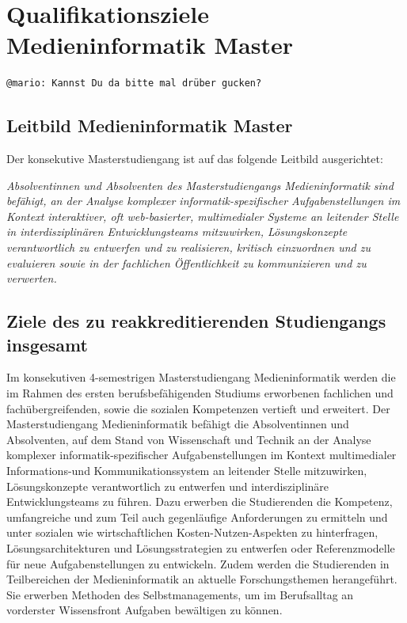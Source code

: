 \chapter{Qualifikationsziele Medieninformatik
Master}\label{qualifikationsziele-medieninformatik-master}

\begin{verbatim}
@mario: Kannst Du da bitte mal drüber gucken?
\end{verbatim}

\section{Leitbild Medieninformatik
Master}\label{leitbild-medieninformatik-master}

Der konsekutive Masterstudiengang ist auf das folgende Leitbild
ausgerichtet:

\emph{Absolventinnen und Absolventen des Masterstudiengangs
Medieninformatik sind befähigt, an der Analyse komplexer
informatik-spezifischer Aufgabenstellungen im Kontext interaktiver, oft
web-basierter, multimedialer Systeme an leitender Stelle in
interdisziplinären Entwicklungsteams mitzuwirken, Lösungskonzepte
verantwortlich zu entwerfen und zu realisieren, kritisch einzuordnen und
zu evaluieren sowie in der fachlichen Öffentlichkeit zu kommunizieren
und zu verwerten.}

\section{Ziele des zu reakkreditierenden Studiengangs
insgesamt}\label{ziele-des-zu-reakkreditierenden-studiengangs-insgesamt}

Im konsekutiven 4-semestrigen Masterstudiengang Medieninformatik werden
die im Rahmen des ersten berufsbefähigenden Studiums erworbenen
fachlichen und fachübergreifenden, sowie die sozialen Kompetenzen
vertieft und erweitert. Der Masterstudiengang Medieninformatik befähigt
die Absolventinnen und Absolventen, auf dem Stand von Wissenschaft und
Technik an der Analyse komplexer informatik-spezifischer
Aufgabenstellungen im Kontext multimedialer Informations-und
Kommunikationssystem an leitender Stelle mitzuwirken, Lösungskonzepte
verantwortlich zu entwerfen und interdisziplinäre Entwicklungsteams zu
führen. Dazu erwerben die Studierenden die Kompetenz, umfangreiche und
zum Teil auch gegenläufige Anforderungen zu ermitteln und unter sozialen
wie wirtschaftlichen Kosten-Nutzen-Aspekten zu hinterfragen,
Lösungsarchitekturen und Lösungsstrategien zu entwerfen oder
Referenzmodelle für neue Aufgabenstellungen zu entwickeln. Zudem werden
die Studierenden in Teilbereichen der Medieninformatik an aktuelle
Forschungsthemen herangeführt. Sie erwerben Methoden des
Selbstmanagements, um im Berufsalltag an vorderster Wissensfront
Aufgaben bewältigen zu können.

